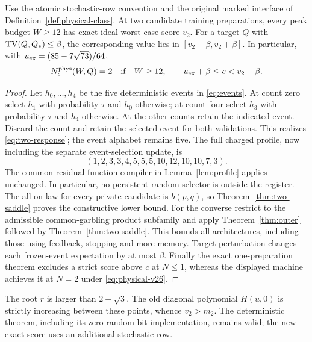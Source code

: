 \begin{corollary}
\label{cor:two-physical-exact}
Use the atomic stochastic-row convention and the original marked
interface of Definition~\ref{def:physical-class}. At two candidate
training preparations, every peak budget $W\ge12$ has exact ideal
worst-case score $v_2$. For a target $Q$ with $\operatorname{TV}(Q,Q_*)\le\beta$,
the corresponding value lies in $[v_2-\beta,v_2+\beta]$. In particular,
with $u_{\rm ex}=(85-7\sqrt{73})/64$,
\begin{equation}\label{eq:physical-v26}
 N_c^{\rm phys}(W,Q)=2\quad\text{if}\quad
 W\ge12,\qquad u_{\rm ex}+\beta\le c<v_2-\beta.
\end{equation}
\end{corollary}
\begin{proof}
Let $h_0,\ldots,h_4$ be the five deterministic events in
\eqref{eq:events}. At count zero select $h_1$ with probability $\tau$
and $h_0$ otherwise; at count four select $h_3$ with probability $\tau$
and $h_4$ otherwise. At the other counts retain the indicated event.
Discard the count and retain the selected event for both validations.
This realizes \eqref{eq:two-response}; the event alphabet remains five.
The full charged profile, now including the separate event-selection
update, is
\[
           (1,2,3,3,4,5,5,5,10,12,10,10,7,3).
\]
The common residual-function compiler in Lemma~\ref{lem:profile} applies
unchanged. In particular, no persistent random selector is outside the
register. The all-on law for every private candidate is $b(p,q)$, so
Theorem~\ref{thm:two-saddle} proves the constructive lower bound.
For the converse restrict to the admissible common-garbling product
subfamily and apply Theorem~\ref{thm:outer} followed by
Theorem~\ref{thm:two-saddle}. This bounds all architectures, including
those using feedback, stopping and more memory. Target perturbation
changes each frozen-event expectation by at most $\beta$. Finally the
exact one-preparation theorem excludes a strict score above $c$ at
$N\le1$, whereas the displayed machine achieves it at $N=2$ under
\eqref{eq:physical-v26}.
\end{proof}

The root $r$ is larger than $2-\sqrt3$. The old diagonal polynomial
$H(u,0)$ is strictly increasing between these points, whence $v_2>m_2$.
The deterministic theorem, including its zero-random-bit implementation,
remains valid; the new exact score uses an additional stochastic row.

